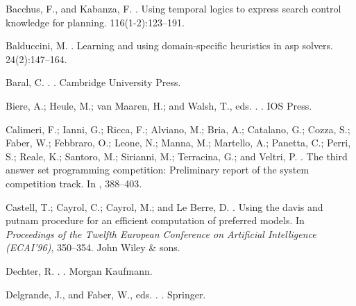 \begin{thebibliography}{}

Bacchus, F., and Kabanza, F.
.
\newblock Using temporal logics to express search control knowledge for
  planning.
 116(1-2):123--191.

Balduccini, M.
.
\newblock Learning and using domain-specific heuristics in asp solvers.
 24(2):147--164.

Baral, C.
.
.
\newblock Cambridge University Press.

Biere, A.; Heule, M.; {van Maaren}, H.; and Walsh, T., eds.
.
.
\newblock IOS Press.

Calimeri, F.; Ianni, G.; Ricca, F.; Alviano, M.; Bria, A.; Catalano, G.; Cozza,
  S.; Faber, W.; Febbraro, O.; Leone, N.; Manna, M.; Martello, A.; Panetta, C.;
  Perri, S.; Reale, K.; Santoro, M.; Sirianni, M.; Terracina, G.; and Veltri,
  P.
.
\newblock The third answer set programming competition: Preliminary report of
  the system competition track.
\newblock In ,  388--403.

Castell, T.; Cayrol, C.; Cayrol, M.; and {Le Berre}, D.
.
\newblock Using the davis and putnam procedure for an efficient computation of
  preferred models.
\newblock In {\em Proceedings of the Twelfth European
  Conference on Artificial Intelligence (ECAI'96)},  350--354.
\newblock John Wiley \& sons.

Dechter, R.
.
.
\newblock Morgan Kaufmann.

Delgrande, J., and Faber, W., eds.
.
. Springer.


\end{thebibliography}
